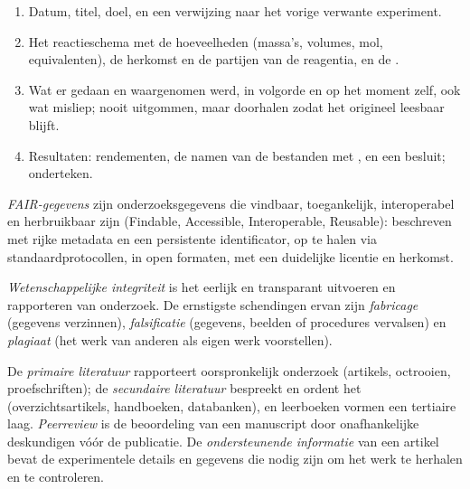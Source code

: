\begin{method}\label{met:b3:lab-techniques-3:notebook}
\begin{enumerate}
  \item Datum, titel, doel, en een verwijzing naar het vorige verwante
        experiment.
  \item Het reactieschema met de hoeveelheden (massa's, volumes, mol,
        equivalenten), de herkomst en de partijen van de reagentia, en de
        .
  \item Wat er gedaan en waargenomen werd, in volgorde en op het moment
        zelf, ook wat misliep; nooit uitgommen, maar doorhalen zodat het
        origineel leesbaar blijft.
  \item Resultaten: rendementen, de namen van de bestanden met , en een besluit; onderteken.
\end{enumerate}
\end{method}

\begin{definition}\label{def:b3:lab-techniques-3:fair}
\emph{FAIR-gegevens} zijn onderzoeksgegevens die
vindbaar, toegankelijk, interoperabel en herbruikbaar zijn (Findable,
Accessible, Interoperable, Reusable): beschreven met rijke metadata en
een persistente identificator, op te halen via standaardprotocollen, in
open formaten, met een duidelijke licentie en herkomst.
\end{definition}

\begin{definition}\label{def:b3:lab-techniques-3:integrity}
\emph{Wetenschappelijke integriteit}
is het eerlijk en transparant uitvoeren en rapporteren van onderzoek. De
ernstigste schendingen ervan zijn
\emph{fabricage} (gegevens verzinnen),
\emph{falsificatie} (gegevens, beelden of procedures
vervalsen) en \emph{plagiaat} (het werk van anderen als
eigen werk voorstellen).
\end{definition}

\begin{definition}[De literatuur]\label{def:b3:lab-techniques-3:literature}
De \emph{primaire literatuur} rapporteert
oorspronkelijk onderzoek (artikels, octrooien, proefschriften); de
\emph{secundaire literatuur} bespreekt en
ordent het (overzichtsartikels, handboeken, databanken), en leerboeken
vormen een tertiaire laag.
\emph{Peerreview} is de beoordeling van een manuscript
door onafhankelijke deskundigen vóór de publicatie. De
\emph{ondersteunende informatie} van een
artikel bevat de experimentele details en gegevens die nodig zijn om het
werk te herhalen en te controleren.
\end{definition}

